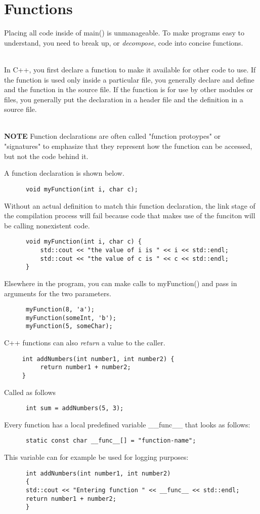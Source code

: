 \documentclass{article}
\begin{document}
\section{Functions}
Placing all code inside of main() is unmanageable. To make programs easy to understand, you need
to break up, or \textit{decompose}, code into concise functions.

\noindent \\ In C++, you first declare a function to make it available for other code to use. If the
function is used only inside a particular file, you generally declare and define and the function in
the source file. If the function is for use by other modules or files, you generally put the declaration
in a header file and the definition in a source file.

\noindent \\ \textbf{NOTE} Function declarations are often called "function protoypes" or "signatures"
to emphasize that they represent how the function can be accessed, but not the code behind it.

A function declaration is shown below.
\begin{verbatim}
      void myFunction(int i, char c);
\end{verbatim}
Without an actual definition to match this function declaration, the link stage of the compilation
process will fail because code that makes use of the funciton will be calling nonexistent code.
\begin{verbatim}
      void myFunction(int i, char c) {
          std::cout << "the value of i is " << i << std::endl;
          std::cout << "the value of c is " << c << std::endl;
      }
\end{verbatim}
Elsewhere in the program, you can make calls to myFunction() and pass in arguments for the two
parameters.
\begin{verbatim}
      myFunction(8, 'a');
      myFunction(someInt, 'b');
      myFunction(5, someChar);
\end{verbatim}
C++ functions can also \textit{return} a value to the caller.
\begin{verbatim}
     int addNumbers(int number1, int number2) {
          return number1 + number2;
     } 
\end{verbatim}
Called as follows
\begin{verbatim}
      int sum = addNumbers(5, 3);
\end{verbatim}
Every function has a local predefined variable \_\_func\_\_ that looks as follows:
\begin{verbatim}
      static const char __func__[] = "function-name";
\end{verbatim}
This variable can for example be used for logging purposes:
\begin{verbatim}
      int addNumbers(int number1, int number2)
      {
      std::cout << "Entering function " << __func__ << std::endl;
      return number1 + number2;
      }
\end{verbatim}
\end{document}
